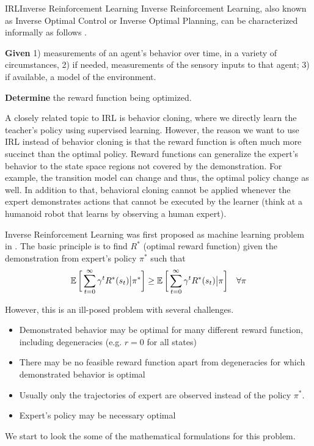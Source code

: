 \documentclass[9pt]{article}
\begin{document}
\begin{topic}{IRL}{Inverse Reinforcement Learning}  Inverse Reinforcement Learning, also known as Inverse Optimal Control or Inverse Optimal Planning, can be characterized informally as follows \citep{Ng2000Algorithms}.

\textbf{Given} 1) measurements of an agent's behavior over time, in a variety of circumstances, 2) if needed, measurements of the sensory inputs to that agent; 3) if available, a model of the environment.

\textbf{Determine} the reward function being optimized.

A closely related topic to IRL is behavior cloning, where we directly learn the teacher's policy using supervised learning. However, the reason we want to use IRL instead of behavior cloning is that the reward function is often much more succinct than the optimal policy. Reward functions can generalize the expert's behavior to the state space regions not covered by the demonstration. For example, the transition model can change and thus, the optimal policy change as well. In addition to that, behavioral cloning cannot be applied whenever the expert demonstrates actions that cannot be executed by the learner (think at a humanoid robot that learns by observing a human expert).

Inverse Reinforcement Learning was first proposed as machine learning problem in \citep{Ng2000Algorithms}.  The basic principle is to find $R^*$ (optimal reward function) given the demonstration from expert's policy $\pi^*$ such that
\[
	\operatorname{\mathbb{E}}\bigg[\sum_{t=0}^{\infty} \gamma^{t} R^{*}(s_t)\big|\pi^{*}\bigg] \ge \operatorname{\mathbb{E}}\bigg[\sum_{t=0}^{\infty} \gamma^{t} R^{*}(s_t)\big|\pi\bigg] \quad \forall \pi
\]

However, this is an ill-posed problem with several challenges. 
\begin{itemize}
\item Demonstrated behavior may be optimal for many different reward function, including degeneracies (e.g. $r = 0$ for all states)
\item There may be no feasible reward function apart from degeneracies for which demonstrated behavior is optimal
\item Usually only the trajectories of expert are observed instead of the policy $\pi^*$.
\item Expert's policy may be necessary optimal
\end{itemize}

We start to look the some of the mathematical formulations for this problem. 

\end{topic}
\end{document}
